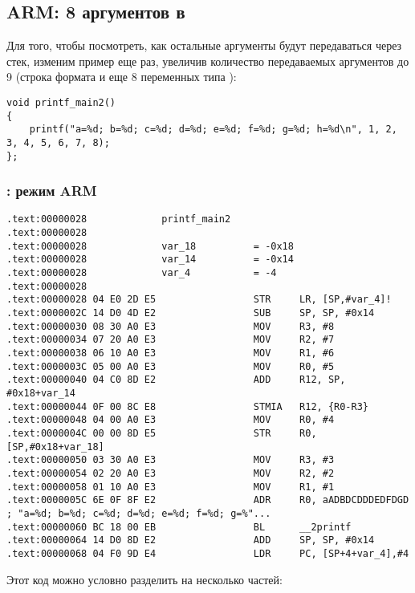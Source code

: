 ﻿%
\subsection{ARM: 8 аргументов в \printf}

Для того, чтобы посмотреть, как остальные аргументы будут передаваться через стек, изменим пример еще раз, 
увеличив количество передаваемых аргументов до 9 (строка формата \printf и еще 8 переменных типа \Tint):

\begin{lstlisting}
void printf_main2()
{
	printf("a=%d; b=%d; c=%d; d=%d; e=%d; f=%d; g=%d; h=%d\n", 1, 2, 3, 4, 5, 6, 7, 8);
};
\end{lstlisting}

\subsubsection{\OptimizingKeil: режим ARM}

\begin{lstlisting}
.text:00000028             printf_main2
.text:00000028
.text:00000028             var_18          = -0x18
.text:00000028             var_14          = -0x14
.text:00000028             var_4           = -4
.text:00000028
.text:00000028 04 E0 2D E5                 STR     LR, [SP,#var_4]!
.text:0000002C 14 D0 4D E2                 SUB     SP, SP, #0x14
.text:00000030 08 30 A0 E3                 MOV     R3, #8
.text:00000034 07 20 A0 E3                 MOV     R2, #7
.text:00000038 06 10 A0 E3                 MOV     R1, #6
.text:0000003C 05 00 A0 E3                 MOV     R0, #5
.text:00000040 04 C0 8D E2                 ADD     R12, SP, #0x18+var_14
.text:00000044 0F 00 8C E8                 STMIA   R12, {R0-R3}
.text:00000048 04 00 A0 E3                 MOV     R0, #4
.text:0000004C 00 00 8D E5                 STR     R0, [SP,#0x18+var_18]
.text:00000050 03 30 A0 E3                 MOV     R3, #3
.text:00000054 02 20 A0 E3                 MOV     R2, #2
.text:00000058 01 10 A0 E3                 MOV     R1, #1
.text:0000005C 6E 0F 8F E2                 ADR     R0, aADBDCDDDEDFDGD ; "a=%d; b=%d; c=%d; d=%d; e=%d; f=%d; g=%"...
.text:00000060 BC 18 00 EB                 BL      __2printf
.text:00000064 14 D0 8D E2                 ADD     SP, SP, #0x14
.text:00000068 04 F0 9D E4                 LDR     PC, [SP+4+var_4],#4
\end{lstlisting}

Этот код можно условно разделить на несколько частей:

